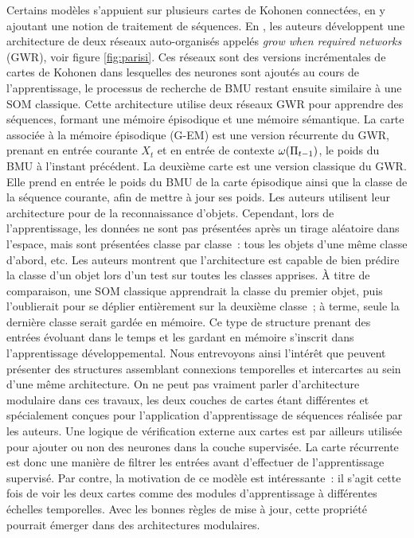 \documentclass[../main]{subfiles}
\begin{document}
Certains modèles s'appuient sur plusieurs cartes de Kohonen connectées, en y ajoutant une notion de traitement de séquences.
En \cite{parisiLL}, les auteurs développent une architecture de deux réseaux auto-organisés appelés \emph{grow when required networks} (GWR), voir figure \ref{fig:parisi}. Ces réseaux sont des versions incrémentales de cartes de Kohonen dans lesquelles des neurones sont ajoutés au cours de l'apprentissage, le processus de recherche de BMU restant ensuite similaire à une SOM classique.
Cette architecture utilise deux réseaux GWR pour apprendre des séquences, formant une mémoire épisodique et une mémoire sémantique.
La carte associée à la mémoire épisodique (G-EM) est une version récurrente du GWR, prenant en entrée courante $X_t$ et en entrée de contexte $\omega(\Pi_{t-1})$, le poids du BMU à l'instant précédent.
La deuxième carte est une version classique du GWR. Elle prend en entrée le poids du BMU de la carte épisodique ainsi que la classe de la séquence courante, afin de mettre à jour ses poids.
Les auteurs utilisent leur architecture pour de la reconnaissance d'objets. Cependant, lors de l'apprentissage, les données ne sont pas présentées après un tirage aléatoire dans l'espace, mais sont présentées classe par classe~: tous les objets d'une même classe d'abord, etc. Les auteurs montrent que l'architecture est capable de bien prédire la classe d'un objet lors d'un test sur toutes les classes apprises. \`{A} titre de comparaison, une SOM classique apprendrait la classe du premier objet, puis l'oublierait pour se déplier entièrement sur la deuxième classe~; à terme, seule la dernière classe serait gardée en mémoire.
Ce type de structure prenant des entrées évoluant dans le temps et les gardant en mémoire s'inscrit dans l'apprentissage développemental. Nous entrevoyons ainsi l'intérêt que peuvent présenter des structures assemblant connexions temporelles et intercartes au sein d'une même architecture.
On ne peut pas vraiment parler d'architecture modulaire dans ces travaux, les deux couches de cartes étant différentes et spécialement conçues pour l'application d'apprentissage de séquences réalisée par les auteurs. Une logique de vérification externe aux cartes est par ailleurs utilisée pour ajouter ou non des neurones dans la couche supervisée. La carte récurrente est donc une manière de filtrer les entrées avant d'effectuer de l'apprentissage supervisé.
Par contre, la motivation de ce modèle est intéressante~: il s'agit cette fois de voir les deux cartes comme des modules d'apprentissage à différentes échelles temporelles. Avec les bonnes règles de mise à jour, cette propriété pourrait émerger dans des architectures modulaires.
\end{document}
